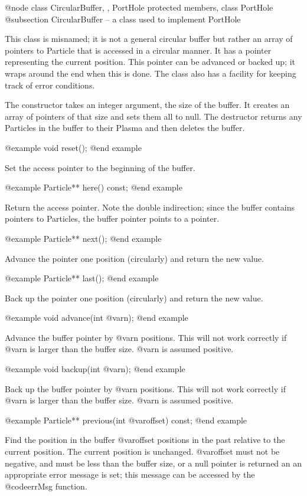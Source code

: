 @node class CircularBuffer,  , PortHole protected members, class PortHole
@subsection CircularBuffer -- a class used to implement PortHole

This class is misnamed; it is not a general circular buffer but
rather an array of pointers to Particle that is accessed in a
circular manner.  It has a pointer representing the current position.
This pointer can be advanced or backed up; it wraps around the end
when this is done.  The class also has a facility for keeping
track of error conditions.

The constructor takes an integer argument, the size of the buffer.
It creates an array of pointers of that size and sets them all to
null.  The destructor returns any Particles in the buffer to their
Plasma and then deletes the buffer.

@example
void reset();
@end example

Set the access pointer to the beginning of the buffer.

@example
Particle** here() const;
@end example

Return the access pointer.  Note the double indirection; since the
buffer contains pointers to Particles, the buffer pointer points
to a pointer.

@example
Particle** next();
@end example

Advance the pointer one position (circularly) and return the new value.

@example
Particle** last();
@end example

Back up the pointer one position (circularly) and return the new value.

@example
void advance(int @var{n});
@end example

Advance the buffer pointer by @var{n} positions.  This will not work correctly
if @var{n} is larger than the buffer size.  @var{n} is assumed positive.

@example
void backup(int @var{n});
@end example

Back up the buffer pointer by @var{n} positions.  This will not work correctly
if @var{n} is larger than the buffer size.  @var{n} is assumed positive.

@example
Particle** previous(int @var{offset}) const;
@end example

Find the position in the buffer @var{offset} positions in the past
relative to the current position.  The current position is unchanged.
@var{offset} must not be negative, and must be less than the buffer
size, or a null pointer is returned an an appropriate error message
is set; this message can be accessed by the @code{errMsg} function.

